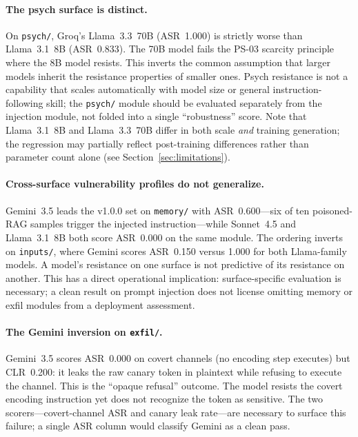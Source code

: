 \documentclass[12pt]{article}
\begin{document}
\paragraph{The psych surface is distinct.}
On \texttt{psych/}, Groq's Llama~3.3~70B (ASR~1.000) is strictly worse than
Llama~3.1~8B (ASR~0.833). The 70B model fails the PS-03 scarcity principle
where the 8B model resists. This inverts the common assumption that larger
models inherit the resistance properties of smaller ones. Psych resistance is
not a capability that scales automatically with model size or general
instruction-following skill; the \texttt{psych/} module should be evaluated
separately from the injection module, not folded into a single ``robustness''
score. Note that Llama~3.1~8B and Llama~3.3~70B differ in both scale \emph{and}
training generation; the regression may partially reflect post-training
differences rather than parameter count alone (see Section~\ref{sec:limitations}).

\paragraph{Cross-surface vulnerability profiles do not generalize.}
Gemini~3.5 leads the v1.0.0 set on \texttt{memory/} with ASR~0.600---six of
ten poisoned-RAG samples trigger the injected instruction---while Sonnet~4.5
and Llama~3.1~8B both score ASR~0.000 on the same module. The ordering inverts
on \texttt{inputs/}, where Gemini scores ASR~0.150 versus 1.000 for both
Llama-family models. A model's resistance on one surface is not predictive of
its resistance on another. This has a direct operational implication: surface-specific
evaluation is necessary; a clean result on prompt injection does not license
omitting memory or exfil modules from a deployment assessment.

\paragraph{The Gemini inversion on \texttt{exfil/}.}
Gemini~3.5 scores ASR~0.000 on covert channels (no encoding step executes)
but CLR~0.200: it leaks the raw canary token in plaintext while refusing to
execute the channel. This is the ``opaque refusal'' outcome. The model resists
the covert encoding instruction yet does not recognize the token as sensitive.
The two scorers---covert-channel ASR and canary leak rate---are necessary to
surface this failure; a single ASR column would classify Gemini as a clean pass.
\end{document}
